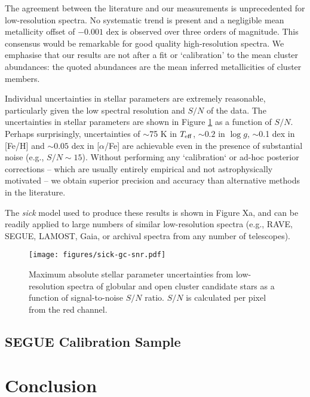 \documentclass{aastex}
\newcommand{\sick}{\textit{sick}}
\begin{document}
The agreement between the literature and our measurements is unprecedented for low-resolution spectra. No systematic trend is present and a negligible mean metallicity offset of $-0.001$ dex is observed over three orders of magnitude. This consensus would be remarkable for good quality high-resolution spectra. We emphasise that our results are not after a fit or `calibration' to the mean cluster abundances: the quoted abundances are the mean inferred metallicities of cluster members.

Individual uncertainties in stellar parameters are extremely reasonable, particularly given the low spectral resolution and $S/N$ of the data. The uncertainties in stellar parameters are shown in Figure \ref{fig:gc-snr} as a function of $S/N$. Perhaps surprisingly, uncertainties of $\sim$75 K in $T_{\rm eff}$, $\sim0.2$ in $\log{g}$, $\sim$0.1 dex in [Fe/H] and $\sim0.05$ dex in [$\alpha$/Fe] are achievable even in the presence of substantial noise (e.g., $S/N \sim 15$). Without performing any `calibration` or ad-hoc posterior corrections -- which are usually entirely empirical and not astrophysically motivated -- we obtain superior precision and accuracy than alternative methods in the literature.

The \sick{} model used to produce these results is shown in Figure Xa, and can be readily applied to large numbers of similar low-resolution spectra (e.g., RAVE, SEGUE, LAMOST, Gaia, or archival spectra from any number of telescopes).

\begin{figure}
\label{fig:gc-snr}
\texttt{[image: figures/sick-gc-snr.pdf]}
\caption{Maximum absolute stellar parameter uncertainties from low-resolution spectra of globular and open cluster candidate stars as a function of signal-to-noise $S/N$ ratio. $S/N$ is calculated per pixel from the red channel.}
\end{figure}



\subsection{SEGUE Calibration Sample}




\section{Conclusion}
\end{document}
